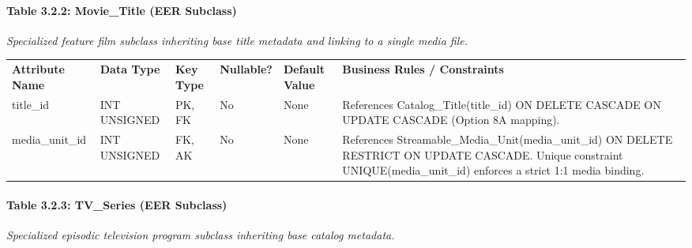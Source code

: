 \paragraph{Table 3.2.2: Movie\_\allowbreak{}Title (EER Subclass)}\label{table-3.2.2-movie_title-eer-subclass}

\emph{Specialized feature film subclass inheriting base title metadata and linking to a single media file.}

{\def\LTcaptype{none} %
\begin{longtable}[]{@{}
  >{\raggedright\arraybackslash}p{}
  >{\raggedright\arraybackslash}p{}
  >{\raggedright\arraybackslash}p{}
  >{\raggedright\arraybackslash}p{}
  >{\raggedright\arraybackslash}p{}
  >{\raggedright\arraybackslash}p{}@{}}
\arrayrulecolor{black}\toprule\noalign{}
\endhead
\bottomrule\noalign{}
\endlastfoot
\textbf{Attribute Name} & \textbf{Data Type} & \textbf{Key Type} & \textbf{Nullable?} & \textbf{Default Value} & \textbf{Business Rules / Constraints} \\ \arrayrulecolor{black}\midrule
title\_\allowbreak{}id & INT UNSIGNED & PK, FK & No & None & References Catalog\_\allowbreak{}Title(title\_\allowbreak{}id) ON DELETE CASCADE ON UPDATE CASCADE (Option 8A mapping). \\ \arrayrulecolor{black!20}\midrule
media\_\allowbreak{}unit\_\allowbreak{}id & INT UNSIGNED & FK, AK & No & None & References Streamable\_\allowbreak{}Media\_\allowbreak{}Unit(media\_\allowbreak{}unit\_\allowbreak{}id) ON DELETE RESTRICT ON UPDATE CASCADE. Unique constraint UNIQUE(media\_\allowbreak{}unit\_\allowbreak{}id) enforces a strict 1:1 media binding. \\
\end{longtable}
}

\paragraph{Table 3.2.3: TV\_\allowbreak{}Series (EER Subclass)}\label{table-3.2.3-tv_series-eer-subclass}

\emph{Specialized episodic television program subclass inheriting base catalog metadata.}

